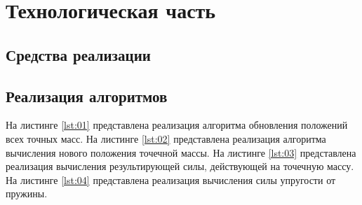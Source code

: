 \chapter{Технологическая часть}

\section{Средства реализации}

\section{Реализация алгоритмов}

На листинге \ref{lst:01} представлена реализация алгоритма обновления
положений всех точных масс. На листинге \ref{lst:02} представлена
реализация алгоритма вычисления нового положения точечной массы. На
листинге \ref{lst:03} представлена реализация вычисления результирующей силы,
действующей на точечную массу. На листинге \ref{lst:04} представлена
реализация вычисления силы упругости от пружины.

